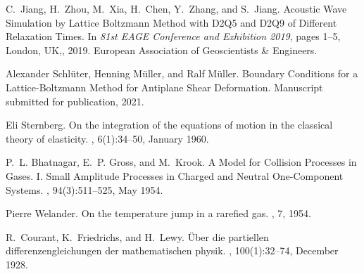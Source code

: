 \documentclass{article}
\begin{document}
\begin{thebibliography}{10}
C.~Jiang, H.~Zhou, M.~Xia, H.~Chen, Y.~Zhang, and S.~Jiang.
\newblock Acoustic {Wave} {Simulation} by {Lattice} {Boltzmann} {Method} with
  {D2Q5} and {D2Q9} of {Different} {Relaxation} {Times}.
\newblock In {\em 81st {EAGE} {Conference} and {Exhibition} 2019}, pages 1--5,
  London, UK,, 2019. European Association of Geoscientists \& Engineers.

Alexander Schlüter, Henning Müller, and Ralf Müller.
\newblock Boundary {Conditions} for a {Lattice}-{Boltzmann} {Method} for
  {Antiplane} {Shear} {Deformation}.
\newblock Manuscript submitted for publication, 2021.

Eli Sternberg.
\newblock On the integration of the equations of motion in the classical theory
  of elasticity.
, 6(1):34--50,
  January 1960.

P.~L. Bhatnagar, E.~P. Gross, and M.~Krook.
\newblock A {Model} for {Collision} {Processes} in {Gases}. {I}. {Small}
  {Amplitude} {Processes} in {Charged} and {Neutral} {One}-{Component}
  {Systems}.
, 94(3):511--525, May 1954.

Pierre Welander.
\newblock On the temperature jump in a rarefied gas.
, 7, 1954.

R.~Courant, K.~Friedrichs, and H.~Lewy.
\newblock \"{U}ber die partiellen differenzengleichungen der mathematischen
  physik.
, 100(1):32--74, December 1928.

\end{thebibliography}
\end{document}
